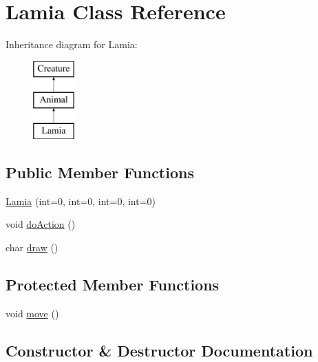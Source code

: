 \hypertarget{class_lamia}{}\section{Lamia Class Reference}
\label{class_lamia}
Inheritance diagram for Lamia\+:\begin{figure}[H]
\begin{center}
\leavevmode
\includegraphics[height=3.000000cm]{class_lamia}
\end{center}
\end{figure}
\subsection*{Public Member Functions}
\begin{DoxyCompactItemize}
\item 
\hyperlink{class_lamia_a0fbc6a5d3b47d02f4455d24e6edf9000}{Lamia} (int=0, int=0, int=0, int=0)
\item 
void \hyperlink{class_lamia_a21663165aa075426083bf34fc6ff753d}{do\+Action} ()
\item 
char \hyperlink{class_lamia_a5bff769396d0bc31d03306ba1c190c39}{draw} ()
\end{DoxyCompactItemize}
\subsection*{Protected Member Functions}
\begin{DoxyCompactItemize}
\item 
void \hyperlink{class_lamia_a216ce1ca528e5bc3f35d882a4bd2cbc4}{move} ()
\end{DoxyCompactItemize}


\subsection{Constructor \& Destructor Documentation}
